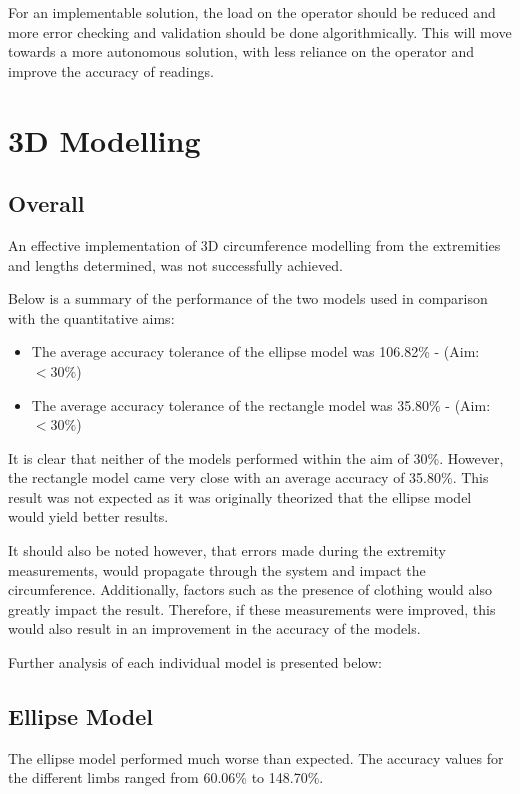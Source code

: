 For an implementable solution, the load on the operator should be reduced and more error checking and validation should be done algorithmically. This will move towards a more autonomous solution, with less reliance on the operator and improve the accuracy of readings. 

\section{3D Modelling}

\subsection{Overall}
An effective implementation of 3D circumference modelling from the extremities and lengths determined, was not successfully achieved. 

Below is a summary of the performance of the two models used in comparison with the quantitative aims:

\begin{itemize}
	\item The average accuracy tolerance of the ellipse model was 106.82\% - (Aim: $<30\%$)
	\item The average accuracy tolerance of the rectangle model was 35.80\% - (Aim: $<30\%$)
\end{itemize}

It is clear that neither of the models performed within the aim of 30\%. However, the rectangle model came very close with an average accuracy of 35.80\%. This result was not expected as it was originally theorized that the ellipse model would yield better results. 

It should also be noted however, that errors made during the extremity measurements, would propagate through the system and impact the circumference. Additionally, factors such as the presence of clothing would also greatly impact the result. Therefore, if these measurements were improved, this would also result in an improvement in the accuracy of the models.   

Further analysis of each individual model is presented below:  

\subsection{Ellipse Model}
The ellipse model performed much worse than expected. The accuracy values for the different limbs ranged from 60.06\% to 148.70\%. 

